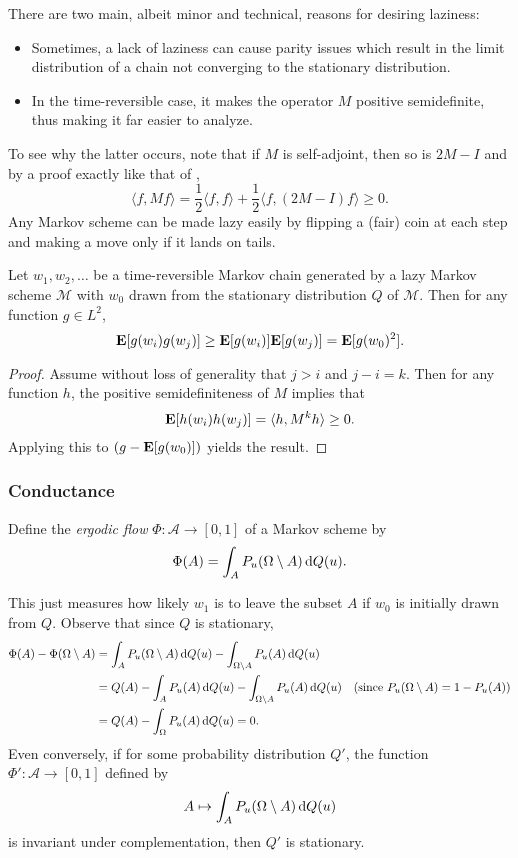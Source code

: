 There are two main, albeit minor and technical, reasons for desiring laziness:
\begin{itemize}
	\item Sometimes, a lack of laziness can cause parity issues which result in the limit distribution of a chain not converging to the stationary distribution.
	\item In the time-reversible case, it makes the operator $M$ positive semidefinite, thus making it far easier to analyze.
\end{itemize}
To see why the latter occurs, note that if $M$ is self-adjoint, then so is $2M-I$ and by a proof exactly like that of ,
\[ \langle f,M f\rangle = \frac{1}{2}\langle f,f\rangle + \frac{1}{2}\langle f,(2M-I)f\rangle \geq 0. \]
Any Markov scheme can be made lazy easily by flipping a (fair) coin at each step and making a move only if it lands on tails.

\begin{lemma}
Let $w_1,w_2,\ldots$ be a time-reversible Markov chain generated by a lazy Markov scheme $\mathcal{M}$ with $w_0$ drawn from the stationary distribution $Q$ of $\mathcal{M}$. Then for any function $g\in L^2$,
\[ \textbf{E}[g(w_i)g(w_j)] \geq \textbf{E}[g(w_i)]\textbf{E}[g(w_j)] = \textbf{E}[g(w_0)^2]. \]
\end{lemma}
\begin{proof}
Assume without loss of generality that $j>i$ and $j-i=k$. Then for any function $h$, the positive semidefiniteness of $M$ implies that
\[ \textbf{E}[h(w_i)h(w_j)] = \langle h, M^k h\rangle \geq 0. \]
Applying this to $(g - \textbf{E}[g(w_0)])$ yields the result.
\end{proof}

\subsubsection{Conductance}

\begin{definition}
Define the \textit{ergodic flow} $\Phi:\mathcal{A}\to[0,1]$ of a Markov scheme by
\[ \Phi(A) = \int_A P_u(\Omega \setminus A) \operatorname{d}\!{Q}(u). \]

\end{definition}

This just measures how likely $w_1$ is to leave the subset $A$ if $w_0$ is initially drawn from $Q$. Observe that since $Q$ is stationary,
\begin{align*}
	\Phi(A) - \Phi(\Omega\setminus A) &= \int_A P_u(\Omega\setminus A)\operatorname{d}\!{Q}(u) - \int_{\Omega\setminus A} P_u(A)\operatorname{d}\!{Q}(u) \\
	&= Q(A) - \int_A P_u(A)\operatorname{d}\!{Q}(u) - \int_{\Omega\setminus A} P_u(A)\operatorname{d}\!{Q}(u) & (\text{since } P_u(\Omega\setminus A)=1-P_u(A)) \\
	&= Q(A) - \int_\Omega P_u(A)\operatorname{d}\!{Q}(u) = 0.
\end{align*}
Even conversely, if for some probability distribution $Q'$, the function $\Phi':\mathcal{A}\to[0,1]$ defined by
\[ A\mapsto \int_A P_u(\Omega\setminus A)\operatorname{d}\!{Q}(u) \]
is invariant under complementation, then $Q'$ is stationary.\\

